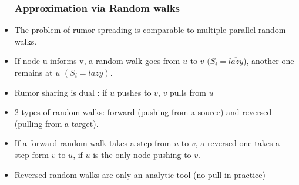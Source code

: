 \documentclass{beamer}
\begin{document}
  \begin{frame}
  \begin{itemize}

    \frametitle{ Approximation via Random walks}
    
    \item The problem of rumor spreading is comparable to multiple parallel random walks.
   \item    If node u informs  v, a random walk goes from $u$ to $v$ $(S_i = \overline{lazy}$), another one remains at $u$ $(S_i=lazy)$. 
   \begin{figure}[h]
\centering
{}

\label{fig:lazyFSM}
\end{figure}

\end{itemize}

  \end{frame}
\begin{frame}
\begin{itemize}
\frametitle{Forward and reversed random walks}
\item Rumor sharing is dual : if $u$ pushes to $v$, $v$ pulls from $u$
\item 2 types of random walks: forward (pushing from a source) and reversed (pulling from a target). 
\item If a forward random walk takes a step from $u$ to $v$, a reversed one   takes a step form $v$ to $u$, if $u$ is the only node pushing to $v$.
\item Reversed random walks are only an analytic tool (no pull in practice)
 
\end{itemize}

\end{frame}
\end{document}
